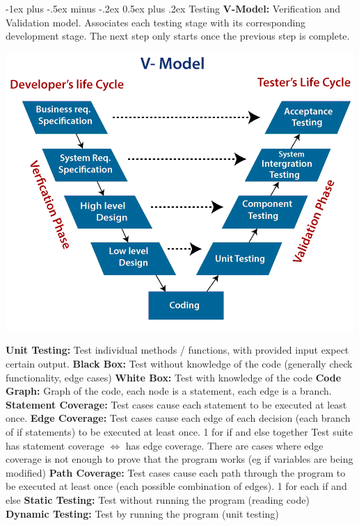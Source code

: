 \documentclass[letterpaper, 8pt]{extarticle}
\makeatletter
\renewcommand{\section}{\@startsection{section}{1}{0mm}%
                                {-1ex plus -.5ex minus -.2ex}%
                                {0.5ex plus .2ex}%
                                {\normalfont\normalsize\bfseries}}
\makeatother
\begin{document}
\begin{multicols*}{5}
  \section{Testing}
  \textbf{V-Model:} Verification and Validation model. Associates each testing stage with its corresponding development stage. The next
  step only starts once the previous step is complete.
  \begin{center}
    \includegraphics[width=\linewidth]{V-Model.png}
  \end{center}
  \textbf{Unit Testing:} Test individual methods / functions, with provided input expect certain output.
  \textbf{Black Box:} Test without knowledge of the code (generally check functionality, edge cases)
  \textbf{White Box:} Test with knowledge of the code
  \textbf{Code Graph:} Graph of the code, each node is a statement, each edge is a branch.
  \textbf{Statement Coverage:} Test cases cause each statement to be executed at least once.
  \textbf{Edge Coverage:} Test cases cause each edge of each decision (each branch of if statements) to be executed at least once. 1 for if and else together
  Test suite has statement coverage $\Leftrightarrow$ has edge coverage.
  There are cases where edge coverage is not enough to prove that the program works
  (eg if variables are being modified)
  \textbf{Path Coverage:} Test cases cause each path through the program to be executed at least once (each possible combination of edges). 1 for each if and else
  \textbf{Static Testing:} Test without running the program (reading code)
  \textbf{Dynamic Testing:} Test by running the program (unit testing)


\end{multicols*}
\end{document}
